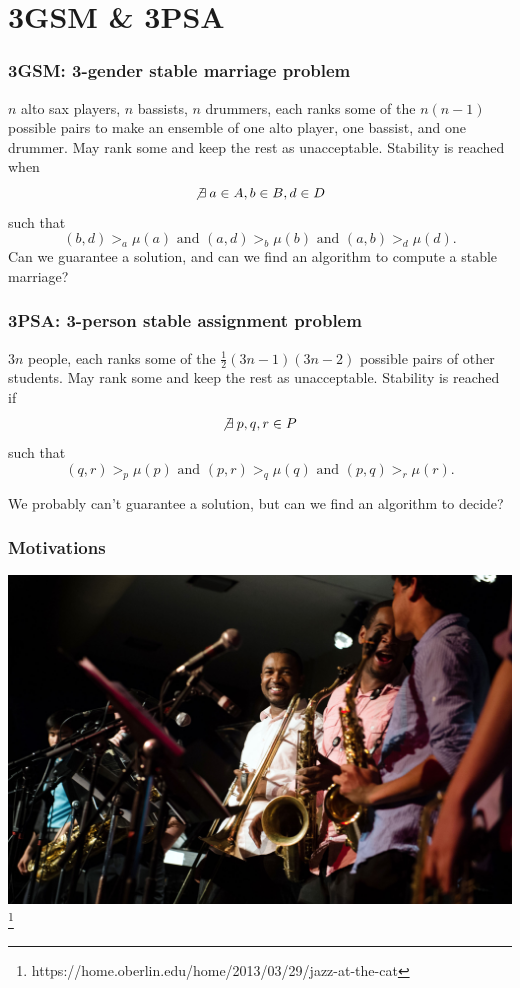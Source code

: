 \documentclass[mathserif,serif]{beamer}
\begin{document}
\frame{\titlepage}

\begin{frame}
	\tableofcontents
\end{frame}


\section{3GSM \& 3PSA}

\begin{frame}
	\frametitle{3GSM: 3-gender stable marriage problem}

	$n$ alto sax players, $n$ bassists, $n$ drummers, each ranks some of the $n(n-1)$ possible pairs to make an
	ensemble of one alto player, one bassist, and one drummer.
	May rank some and keep the rest as unacceptable.
	Stability is reached when
	\[
	\not\exists \: a \in A, b \in B, d \in D
	\]
	such that
	\[
	(b,d) >_a \mu(a) \text{ and } (a,d) >_b \mu(b) \text{ and } (a,b) >_d \mu(d).
	\]
	Can we guarantee a solution, and can we find an algorithm to compute a stable marriage?
\end{frame}

\begin{frame}
	\frametitle{3PSA: 3-person stable assignment problem}

	$3n$ people, each ranks some of the $\frac{1}{2}(3n-1)(3n-2)$ possible pairs of other students.
	May rank some and keep the rest as unacceptable.
	Stability is reached if
	\[
	\not\exists \: p, q, r \in P
	\]
	such that
	\[
	(q,r) >_p \mu(p) \text{ and } (p,r) >_q \mu(q) \text{ and } (p,q) >_r \mu(r).
	\]

	We probably can't guarantee a solution, but can we find an algorithm to decide?
\end{frame}

\begin{frame}
	\frametitle{Motivations}

	\includegraphics[width=\textwidth]{cat-jazz}
        \footnote{https://home.oberlin.edu/home/2013/03/29/jazz-at-the-cat}
\end{frame}
\end{document}
